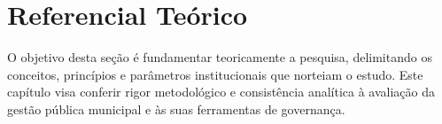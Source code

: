 \chapter{Referencial Teórico}
O objetivo desta seção é fundamentar teoricamente a pesquisa, delimitando os conceitos, princípios e 
parâmetros institucionais que norteiam o estudo. Este capítulo visa conferir rigor metodológico e 
consistência analítica à avaliação da gestão pública municipal e às suas ferramentas de governança.





% 

% 

% 

% 


